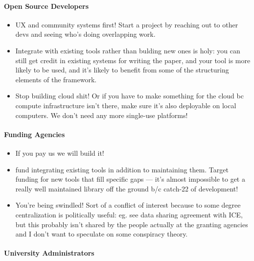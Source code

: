 \documentclass[10pt]{article}
\begin{document}
\begin{multicols}{2}
\hypertarget{open-source-developers}{%
\paragraph{Open Source Developers}\label{open-source-developers}}

\begin{itemize}

\item
  UX and community systems first! Start a project by reaching out to
  other devs and seeing who's doing overlapping work.
\item
  Integrate with existing tools rather than bulding new ones is holy:
  you can still get credit in existing systems for writing the paper,
  and your tool is more likely to be used, and it's likely to benefit
  from some of the structuring elements of the framework.
\item
  Stop building cloud shit! Or if you have to make something for the
  cloud bc compute infrastructure isn't there, make sure it's also
  deployable on local computers. We don't need any more single-use
  platforms!
\end{itemize}

\hypertarget{funding-agencies}{%
\paragraph{Funding Agencies}\label{funding-agencies}}

\begin{itemize}

\item
  If you pay us we will build it!
\item
  fund integrating existing tools in addition to maintaining them.
  Target funding for new tools that fill specific gaps --- it's almost
  impossible to get a really well maintained library off the ground b/c
  catch-22 of development!
\item
  You're being swindled! Sort of a conflict of interest because to some
  degree centralization is politically useful: eg. see data sharing
  agreement with ICE, but this probably isn't shared by the people
  actually at the granting agencies and I don't want to speculate on
  some conspiracy theory.
\end{itemize}

\hypertarget{university-administrators}{%
\paragraph{University Administrators}\label{university-administrators}}


\end{multicols}
\end{document}
